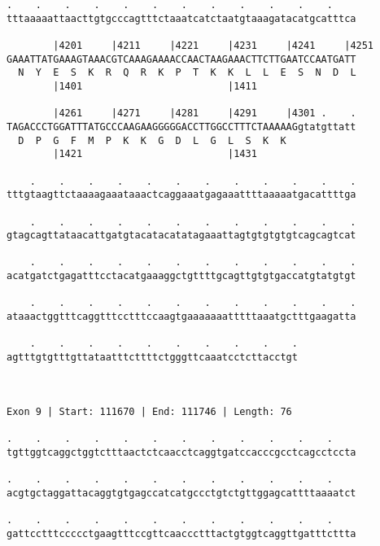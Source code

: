 \documentclass{article}
\begin{document}
\begin{Verbatim}
.    .    .    .    .    .    .    .    .    .    .    .    
tttaaaaattaacttgtgcccagtttctaaatcatctaatgtaaagatacatgcatttca
                                                            
        |4201     |4211     |4221     |4231     |4241     |4251
GAAATTATGAAAGTAAACGTCAAAGAAAACCAACTAAGAAACTTCTTGAATCCAATGATT
  N  Y  E  S  K  R  Q  R  K  P  T  K  K  L  L  E  S  N  D  L
        |1401                         |1411                 
  
        |4261     |4271     |4281     |4291     |4301 .    .
TAGACCCTGGATTTATGCCCAAGAAGGGGGACCTTGGCCTTTCTAAAAAGgtatgttatt
  D  P  G  F  M  P  K  K  G  D  L  G  L  S  K  K            
        |1421                         |1431                 
  
    .    .    .    .    .    .    .    .    .    .    .    .
tttgtaagttctaaaagaaataaactcaggaaatgagaaattttaaaaatgacattttga
                                                            
    .    .    .    .    .    .    .    .    .    .    .    .
gtagcagttataacattgatgtacatacatatagaaattagtgtgtgtgtcagcagtcat
                                                            
    .    .    .    .    .    .    .    .    .    .    .    .
acatgatctgagatttcctacatgaaaggctgttttgcagttgtgtgaccatgtatgtgt
                                                            
    .    .    .    .    .    .    .    .    .    .    .    .
ataaactggtttcaggtttcctttccaagtgaaaaaaatttttaaatgctttgaagatta
                                                            
    .    .    .    .    .    .    .    .    .    .
agtttgtgtttgttataatttcttttctgggttcaaatcctcttacctgt
                                                  
                                                  
 
Exon 9 | Start: 111670 | End: 111746 | Length: 76
 
.    .    .    .    .    .    .    .    .    .    .    .    
tgttggtcaggctggtctttaactctcaacctcaggtgatccacccgcctcagcctccta
                                                            
.    .    .    .    .    .    .    .    .    .    .    .    
acgtgctaggattacaggtgtgagccatcatgccctgtctgttggagcattttaaaatct
                                                            
.    .    .    .    .    .    .    .    .    .    .    .    
gattcctttccccctgaagtttccgttcaaccctttactgtggtcaggttgatttcttta
                                                            

\end{Verbatim}
\end{document}
